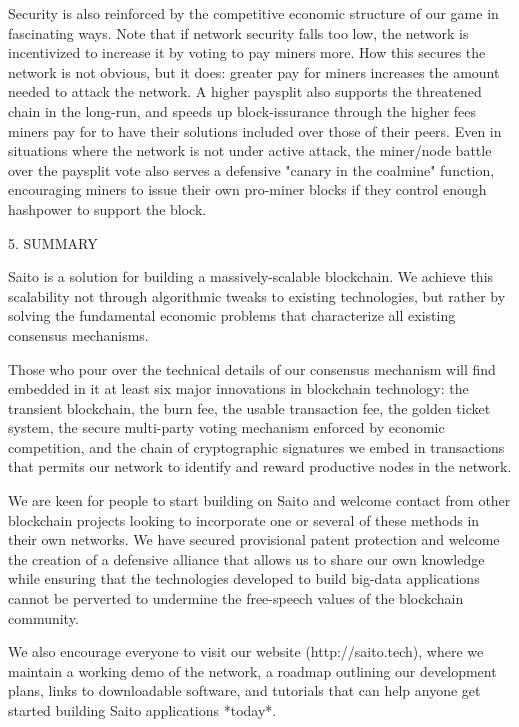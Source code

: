 \documentclass[11.5pt, oneside]{article}   	%
\begin{document}
\begin{multicols}{2}
Security is also reinforced by the competitive economic structure of our game in fascinating ways. Note that if network security falls too low, the network is incentivized to increase it by voting to pay miners more. How this secures the network is not obvious, but it does: greater pay for miners increases the amount needed to attack the network. A higher paysplit also supports the threatened chain in the long-run, and speeds up block-issurance through the higher fees miners pay for to have their solutions included over those of their peers. Even in situations where the network is not under active attack, the miner/node battle over the paysplit vote also serves a defensive "canary in the coalmine" function, encouraging miners to issue their own pro-miner blocks if they control enough hashpower to support the block.

5. SUMMARY

Saito is a solution for building a massively-scalable blockchain. We achieve this scalability not through algorithmic tweaks to existing technologies, but rather by solving the fundamental economic problems that characterize all existing consensus mechanisms.

Those who pour over the technical details of our consensus mechanism will find embedded in it at least six major innovations in blockchain technology: the transient blockchain, the burn fee, the usable transaction fee, the golden ticket system, the secure multi-party voting mechanism enforced by economic competition, and the chain of cryptographic signatures we embed in transactions that permits our network to identify and reward productive nodes in the network.  

We are keen for people to start building on Saito and welcome contact from other blockchain projects looking to incorporate one or several of these methods in their own networks. We have secured provisional patent protection and welcome the creation of a defensive alliance that allows us to share our own knowledge while ensuring that the technologies developed to build big-data applications cannot be perverted to undermine the free-speech values of the blockchain community.

We also encourage everyone to visit our website (http://saito.tech), where we maintain a working demo of the network, a roadmap outlining our development plans, links to downloadable software, and tutorials that can help anyone get started building Saito applications *today*. 

\end{multicols} 
\end{document}
